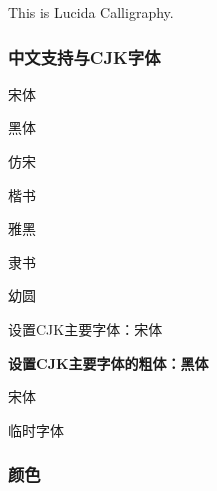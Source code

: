 \documentclass{ctexart}
\begin{document}
            {\lucida This is Lucida Calligraphy.}


        \subsubsection{中文支持与CJK字体}
            {\songti 宋体}

            {\heiti 黑体}

            {\fangsong 仿宋}

            {\kaishu 楷书}

            {\yahei 雅黑}

            {\lishu 隶书}

            {\youyuan 幼圆}
            
            设置CJK主要字体：宋体

            \textbf{设置CJK主要字体的粗体：黑体}
        

            {\songtii 宋体}

            { 临时字体}

        \subsubsection{颜色}\label{subsubsec:3.4.6}
            {\color{goldenrod}{秋麒麟色}}
\end{document}
